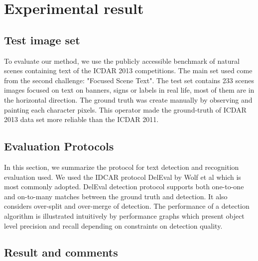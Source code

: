 
\graphicspath{ {5chapterImplementation/image/} }
\chapter{Experimental result}
\section{Test image set}
To evaluate our method, we use the publicly accessible benchmark of natural scenes containing text of the ICDAR 2013 competitions. The main set used come from the second challenge: "Focused Scene Text". The test set contains 233 scenes images focused on text on banners, signs or labels in real life, most of them are in the horizontal direction. The ground truth was create manually by observing and painting each character pixels. This operator made the ground-truth of ICDAR 2013 data set more reliable than the ICDAR 2011.   
 
\section{Evaluation Protocols}
In this section, we summarize the protocol for text detection and recognition evaluation used. We used the IDCAR protocol DelEval by Wolf et al \cite{} which is most commonly adopted. DelEval detection protocol supports both one-to-one and on-to-many matches between the ground truth and detection. It also considers over-split and over-merge of detection. The performance of a detection algorithm is illustrated intuitively by performance graphs which present object level precision and recall depending on constraints on detection quality.
\section{Result and comments}